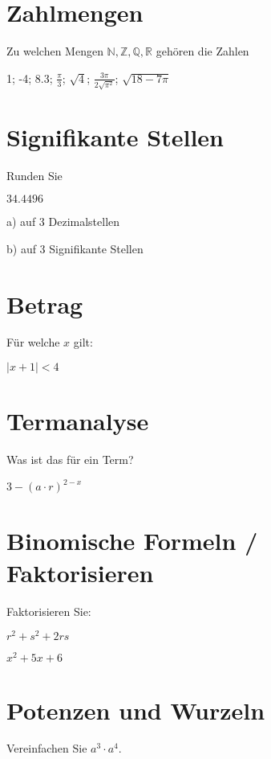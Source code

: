 


\usepackage{amssymb} %
\renewcommand{\metaHeaderLine}{Rückblick}
\renewcommand{\arbeitsblattTitel}{1. Jahr TALS}

\arbeitsblattHeader{}

\section{Zahlmengen}
Zu welchen Mengen $\mathbb{N}, \mathbb{Z}, \mathbb{Q}, \mathbb{R}$ gehören die Zahlen

1; -4; 8.3; $\frac{\pi}{3}$; $\sqrt{4}$; $\frac{3\pi}{2\sqrt{\pi^2}}$; $\sqrt{18-7\pi}$

\section{Signifikante Stellen}
Runden Sie

$34.4496$

a) auf 3 Dezimalstellen 

b) auf 3 Signifikante Stellen 


\section{Betrag}
Für welche $x$ gilt:

$|x+1| < 4$


\section{Termanalyse}
Was ist das für ein Term?

$3 - (a\cdot{}r)^{2-x}$ 

\section{Binomische Formeln / Faktorisieren}
Faktorisieren Sie:

$r^2 + s^2 + 2rs$    

$x^2 + 5x + 6$ 


\section{Potenzen und Wurzeln}
Vereinfachen Sie $a^3 \cdot{} a^4$. 

